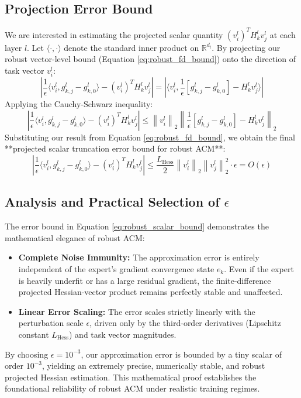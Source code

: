 \subsection{Projection Error Bound}
We are interested in estimating the projected scalar quantity $(v_i^l)^T H_k^l v_j^l$ at each layer $l$. Let $\langle \cdot, \cdot \rangle$ denote the standard inner product on $\mathbb{R}^{d_l}$. By projecting our robust vector-level bound (Equation \ref{eq:robust_fd_bound}) onto the direction of task vector $v_i^l$:
\begin{equation}
    \left| \frac{1}{\epsilon} \langle v_i^l, g_{k,j}^l - g_{k,0}^l \rangle - (v_i^l)^T H_k^l v_j^l \right| = \left| \langle v_i^l, \frac{1}{\epsilon} \left[ g_{k,j}^l - g_{k,0}^l \right] - H_k^l v_j^l \rangle \right|
\end{equation}
Applying the Cauchy-Schwarz inequality:
\begin{equation}
    \left| \frac{1}{\epsilon} \langle v_i^l, g_{k,j}^l - g_{k,0}^l \rangle - (v_i^l)^T H_k^l v_j^l \right| \le \left\| v_i^l \right\|_2 \left\| \frac{1}{\epsilon} \left[ g_{k,j}^l - g_{k,0}^l \right] - H_k^l v_j^l \right\|_2
\end{equation}
Substituting our result from Equation \ref{eq:robust_fd_bound}, we obtain the final **projected scalar truncation error bound for robust ACM**:
\begin{equation}
    \left| \frac{1}{\epsilon} \langle v_i^l, g_{k,j}^l - g_{k,0}^l \rangle - (v_i^l)^T H_k^l v_j^l \right| \le \frac{L_{\text{Hess}}}{2} \left\| v_i^l \right\|_2 \left\| v_j^l \right\|_2^2 \cdot \epsilon = O(\epsilon)
\label{eq:robust_scalar_bound}
\end{equation}

\subsection{Analysis and Practical Selection of $\epsilon$}
The error bound in Equation \ref{eq:robust_scalar_bound} demonstrates the mathematical elegance of robust ACM:
\begin{itemize}
    \item \textbf{Complete Noise Immunity:} The approximation error is entirely independent of the expert's gradient convergence state $e_k$. Even if the expert is heavily underfit or has a large residual gradient, the finite-difference projected Hessian-vector product remains perfectly stable and unaffected.
    \item \textbf{Linear Error Scaling:} The error scales strictly linearly with the perturbation scale $\epsilon$, driven only by the third-order derivatives (Lipschitz constant $L_{\text{Hess}}$) and task vector magnitudes.
\end{itemize}
By choosing $\epsilon = 10^{-3}$, our approximation error is bounded by a tiny scalar of order $10^{-3}$, yielding an extremely precise, numerically stable, and robust projected Hessian estimation. This mathematical proof establishes the foundational reliability of robust ACM under realistic training regimes.

